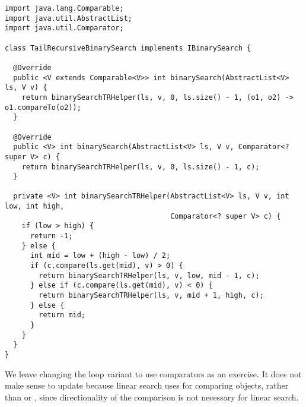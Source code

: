 \begin{lstlisting}[language=MyJava]
import java.lang.Comparable;
import java.util.AbstractList;
import java.util.Comparator;

class TailRecursiveBinarySearch implements IBinarySearch {
  
  @Override
  public <V extends Comparable<V>> int binarySearch(AbstractList<V> ls, V v) {
    return binarySearchTRHelper(ls, v, 0, ls.size() - 1, (o1, o2) -> o1.compareTo(o2));
  }
  
  @Override
  public <V> int binarySearch(AbstractList<V> ls, V v, Comparator<? super V> c) {
    return binarySearchTRHelper(ls, v, 0, ls.size() - 1, c);
  }
  
  private <V> int binarySearchTRHelper(AbstractList<V> ls, V v, int low, int high,
                                       Comparator<? super V> c) {
    if (low > high) { 
      return -1; 
    } else {
      int mid = low + (high - low) / 2;
      if (c.compare(ls.get(mid), v) > 0) { 
        return binarySearchTRHelper(ls, v, low, mid - 1, c); 
      } else if (c.compare(ls.get(mid), v) < 0) { 
        return binarySearchTRHelper(ls, v, mid + 1, high, c); 
      } else { 
        return mid; 
      }
    }
  }
}
\end{lstlisting}

We leave changing the loop variant to use comparators as an exercise. 
It does not make sense to update  because linear search uses  for comparing objects, rather than  or , since directionality of the comparison is not necessary for linear search.
